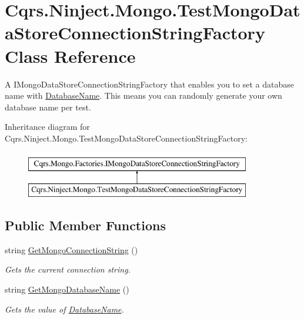 \hypertarget{classCqrs_1_1Ninject_1_1Mongo_1_1TestMongoDataStoreConnectionStringFactory}{}\section{Cqrs.\+Ninject.\+Mongo.\+Test\+Mongo\+Data\+Store\+Connection\+String\+Factory Class Reference}
\label{classCqrs_1_1Ninject_1_1Mongo_1_1TestMongoDataStoreConnectionStringFactory}


A I\+Mongo\+Data\+Store\+Connection\+String\+Factory that enables you to set a database name with \hyperlink{classCqrs_1_1Ninject_1_1Mongo_1_1TestMongoDataStoreConnectionStringFactory_a911d570725e6702a9c1d16321202d89f_a911d570725e6702a9c1d16321202d89f}{Database\+Name}. This means you can randomly generate your own database name per test.  


Inheritance diagram for Cqrs.\+Ninject.\+Mongo.\+Test\+Mongo\+Data\+Store\+Connection\+String\+Factory\+:\begin{figure}[H]
\begin{center}
\leavevmode
\includegraphics[height=2.000000cm]{classCqrs_1_1Ninject_1_1Mongo_1_1TestMongoDataStoreConnectionStringFactory}
\end{center}
\end{figure}
\subsection*{Public Member Functions}
\begin{DoxyCompactItemize}
\item 
string \hyperlink{classCqrs_1_1Ninject_1_1Mongo_1_1TestMongoDataStoreConnectionStringFactory_ae23b67139698984823fa7c250dcca47a_ae23b67139698984823fa7c250dcca47a}{Get\+Mongo\+Connection\+String} ()
\begin{DoxyCompactList}\small\item\em Gets the current connection string. \end{DoxyCompactList}\item 
string \hyperlink{classCqrs_1_1Ninject_1_1Mongo_1_1TestMongoDataStoreConnectionStringFactory_ac638a5771711c1d0746ee0ec55c5e192_ac638a5771711c1d0746ee0ec55c5e192}{Get\+Mongo\+Database\+Name} ()
\begin{DoxyCompactList}\small\item\em Gets the value of \hyperlink{classCqrs_1_1Ninject_1_1Mongo_1_1TestMongoDataStoreConnectionStringFactory_a911d570725e6702a9c1d16321202d89f_a911d570725e6702a9c1d16321202d89f}{Database\+Name}. \end{DoxyCompactList}\end{DoxyCompactItemize}
